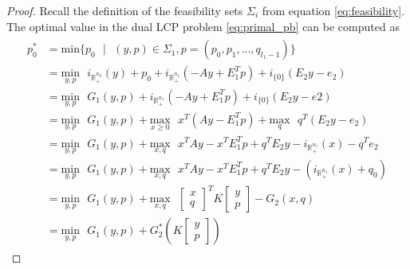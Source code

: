 \documentclass[12pt]{article}
\begin{document}
\begin{proof}
Recall the definition of the feasibility sets $\Sigma_i$ from equation \eqref{eq:feasibility}.
The optimal value in the dual LCP problem \eqref{eq:primal_pb} can be computed as 
\begin{eqnarray*}
  \begin{aligned}
    p_0^* &= \text{min}\{p_0\text{ }|\text{ } (y, p) \in \Sigma_1, p = (p_0, p_1, ..., q_{l_1-1})\}\\
    &= \underset{y,p}{\text{min}}\text{ }i_{\mathbb{R}^{n_2}_+}(y) + p_0 + i_{\mathbb{R}^{n_1}_+}(-Ay + E_1^Tp) + i_{\{0\}}(E_2y - e_2)\\
    &= \underset{y,p}{\text{min}}\text{ }G_1(y,p) + i_{\mathbb{R}^{n_1}_+}(-Ay + E_1^Tp) + i_{\{0\}}(E_2y - e2)\\
    &= \underset{y,p}{\text{min}}\text{ }G_1(y,p) + \underset{x \geq 0}{\text{max}}\text{ }x^T(Ay - E_1^Tp) + \underset{q}{\text{max}}\text{ }q^T(E_2y - e_2)\\
    &= \underset{y,p}{\text{min}}\text{ }G_1(y,p) + \underset{x, q}{\text{max}}\text{ }x^TAy - x^TE_1^Tp + q^TE_2y - i_{\mathbb{R}^{n_1}_+}(x) - q^Te_2\\
    &= \underset{y,p}{\text{min}}\text{ }G_1(y,p) + \underset{x, q}{\text{max}}\text{ }x^TAy - x^TE_1^Tp + q^TE_2y - (i_{\mathbb{R}^{n_1}_+}(x) + q_0)\\
    &= \underset{y,p}{\text{min}}\text{ }G_1(y,p) + \underset{x,q}{\text{max}}\text{ }\begin{bmatrix}x\\q\end{bmatrix}^TK\begin{bmatrix}y\\p\end{bmatrix} - G_2(x, q) \\
      &= \underset{y,p}{\text{min}}\text{ }G_1(y,p) + G_2^*\left(K\begin{bmatrix}y\\p\end{bmatrix}\right)
  \end{aligned}
  \label{eq:a}
\end{eqnarray*}

\end{proof}
\end{document}
